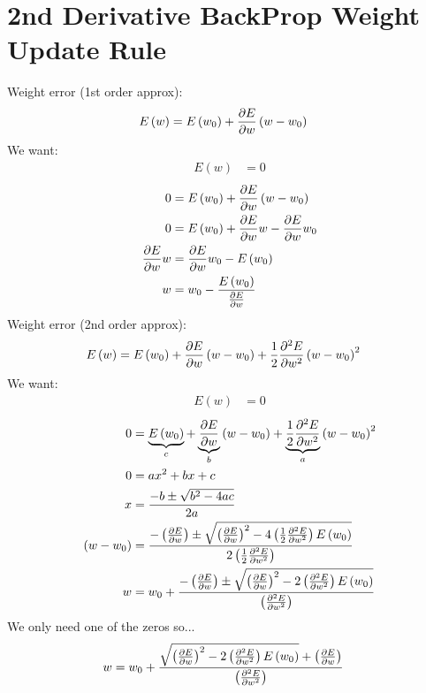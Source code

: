 \section{2nd Derivative BackProp Weight Update Rule}
Weight error (1st order approx):
\begin{align}
E\left(w\right) &= E\left(w_0\right) + \pdv{E}{w}\left(w - w_0\right)
\end{align}
We want:
\begin{align}
E\left(w\right) &= 0
\end{align}
\begin{align}
0 &= E\left(w_0\right) + \pdv{E}{w}\left(w - w_0\right)
\\
0 &= E\left(w_0\right) + \pdv{E}{w}w - \pdv{E}{w}w_0
\\
\pdv{E}{w}w  &= \pdv{E}{w}w_0 - E\left(w_0\right)
\\
w  &= w_0 - \frac{E\left(w_0\right)}{\pdv{E}{w}} 
\end{align}
Weight error (2nd order approx):
\begin{align}
E\left(w\right) &= E\left(w_0\right) + \pdv{E}{w}\left(w - w_0\right) + \frac{1}{2}\pdv[2]{E}{w}\left(w - w_0\right)^2
\end{align}
We want:
\begin{align}
E\left(w\right) &= 0
\end{align}
\begin{align}
0 &= 
\underbrace{E\left(w_0\right)}
_{c}
+ 
\underbrace{\pdv{E}{w}}
_{b} 
\left(w - w_0\right)
+ 
\underbrace{\frac{1}{2}\pdv[2]{E}{w}}
_{a}
\left(w - w_0\right)^2
\\
0 &= ax^2 + bx + c \\
x &= \frac{-b \pm \sqrt{b^2 - 4ac}}{2a}
\\
\left(w - w_0\right) &= \frac{-\left(\pdv{E}{w}\right) \pm \sqrt{\left(\pdv{E}{w}\right)^2 - 4\left(\frac{1}{2}\pdv[2]{E}{w}\right)E\left(w_0\right)}}{2\left(\frac{1}{2}\pdv[2]{E}{w}\right)}
\\
w &= w_0 + \frac{-\left(\pdv{E}{w}\right) \pm \sqrt{\left(\pdv{E}{w}\right)^2 - 2\left(\pdv[2]{E}{w}\right)E\left(w_0\right)}}{\left(\pdv[2]{E}{w}\right)}
\end{align}
We only need one of the zeros so...
\begin{align}
w &= w_0 + \frac{\sqrt{\left(\pdv{E}{w}\right)^2 - 2\left(\pdv[2]{E}{w}\right)E\left(w_0\right)} + \left(\pdv{E}{w}\right)}{\left(\pdv[2]{E}{w}\right)}
\end{align}